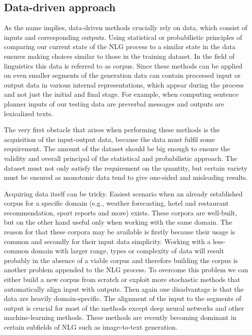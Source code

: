 \subsection{Data-driven approach}
As the name implies, data-driven methods crucially rely on data, which consist of inputs and corresponding outputs. Using statistical or probabilistic principles of comparing our current state of the NLG process to a similar state in the data ensures making choices similar to those in the training dataset. In the field of linguistics this data is referred to as corpus. Since these methods can be applied on even smaller segments of the generation data can contain processed input or output data in various internal representations, which appear during the process and not just the initial and final stage. For example, when computing sentence planner inputs of our testing data are preverbal messages and outputs are lexicalized texts.

The very first obstacle that arises when performing these methods is the acquisition of the input-output data, because the data must fulfil some requirement. The amount of the dataset should be big enough to ensure the validity and overall principal of the statistical and probabilistic approach. The dataset must not only satisfy the requirement on the quantity, but certain variety must be ensured as monotonic data tend to give one-sided and misleading results. 

Acquiring data itself can be tricky. Easiest scenario when an already established corpus for a specific domain (e.g., weather forecasting, hotel and restaurant recommendation, sport reports and more) exists. These corpora are well-built, but on the other hand useful only when working with the same domain. The reason for that these corpora may be available is firstly because their usage is common and secondly for their input data simplicity. Working with a less-common domain with larger range, types or complexity of data will result probably in the absence of a viable corpus and therefore building the corpus is another problem appended to the NLG process. To overcome this problem we can either build a new corpus from scratch or exploit more stochastic methods that automatically align input with outputs. Then again one disadvantage is that the data are heavily domain-specific. The alignment of the input to the segments of output is crucial for most of the methods except deep neural networks and other machine-learning methods. These methods are recently becoming dominant in certain subfields of NLG such as image-to-text generation.

